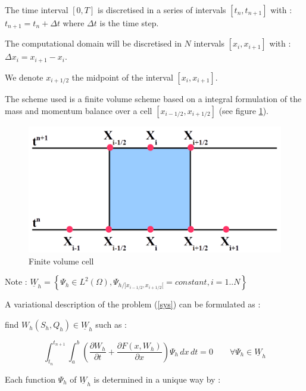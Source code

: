 The time interval $[0,T]$ is discretised in a series of intervals $[t_n , t_{n+1}]$ with : $t_{n+1} = t_n + \Delta t$ where $\Delta t$ is the time step.

The computational domain will be discretised in $N$ intervals $[x_i , x_{i+1}]$ with : $\Delta x_i = x_{i+1} - x_i$.

We denote $x_{i+1/2}$ the midpoint of the interval $[x_i , x_{i+1}]$.

The scheme used is a finite volume scheme based on a integral formulation of the mass and momentum balance over a cell $[x_{i-1/2},x_{i+1/2}]$ (see figure \ref{fig:Schm1}).

\begin{figure}[H]
 \begin{center}
  \includegraphics[width=\textwidth]{Figures/Schema1.png}
  \caption{Finite volume cell}
  \label{fig:Schm1}
 \end{center}
\end{figure}

\begin{CommentBlock}{Note :}
$\underline{W}_h = \left \lbrace \Psi_h \in L^2 (\Omega), \Psi_{h/]x_{i-1/2},x_{i+1/2}[} = constant, i = 1..N \right \rbrace$
\end{CommentBlock}

A variational description of the problem (\ref{sys}) can be formulated as :

find $W_h(S_h,Q_h) \in \underline{W}_h$ such as :

\begin{equation}
 \label{fvar}
 \int_{t_n}^{t_{n+1}} \int_{a}^{b} \left ( \frac{\partial W_h}{\partial t} + \frac{\partial F(x,W_h)}{\partial x} \right ) \Psi_h \, dx \, dt = 0 \qquad \forall \Psi_h \in \underline{W}_h
\end{equation}

Each function $\Psi_h$ of $\underline{W}_h$ is determined in a unique way by :

